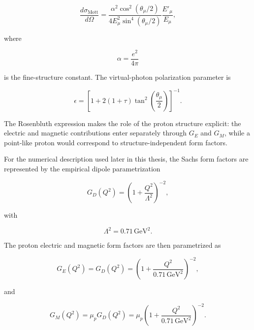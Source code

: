 \begin{equation}
\frac{d\sigma_{\mathrm{Mott}}}{d\Omega}
=
\frac{
\alpha^2
\cos^2\left(\theta_\mu/2\right)
}{
4E_\mu^2
\sin^4\left(\theta_\mu/2\right)
}
\frac{E'_\mu}{E_\mu},
\label{eq:mott_cross_section}
\end{equation}

where

\[
\alpha=\frac{e^2}{4\pi}
\]

is the fine-structure constant. The virtual-photon polarization parameter is

\begin{equation}
\epsilon
=
\left[
1
+
2(1+\tau)
\tan^2\left(\frac{\theta_\mu}{2}\right)
\right]^{-1}.
\label{eq:epsilon}
\end{equation}

The Rosenbluth expression makes the role of the proton structure explicit: the electric and magnetic contributions enter separately through \(G_E\) and \(G_M\), while a point-like proton would correspond to structure-independent form factors.


For the numerical description used later in this thesis, the Sachs form factors are represented by the empirical dipole parametrization

\begin{equation}
G_D(Q^2)
=
\left(
1+\frac{Q^2}{\Lambda^2}
\right)^{-2},
\label{eq:dipole_form_factor}
\end{equation}

with

\[
\Lambda^2
=
0.71\,\mathrm{GeV}^2.
\]

The proton electric and magnetic form factors are then parametrized as

\begin{equation}
G_E(Q^2)
=
G_D(Q^2)
=
\left(
1+\frac{Q^2}{0.71\,\mathrm{GeV}^2}
\right)^{-2},
\label{eq:GE_dipole}
\end{equation}

and

\begin{equation}
G_M(Q^2)
=
\mu_p G_D(Q^2)
=
\mu_p
\left(
1+\frac{Q^2}{0.71\,\mathrm{GeV}^2}
\right)^{-2}.
\label{eq:GM_dipole}
\end{equation}


